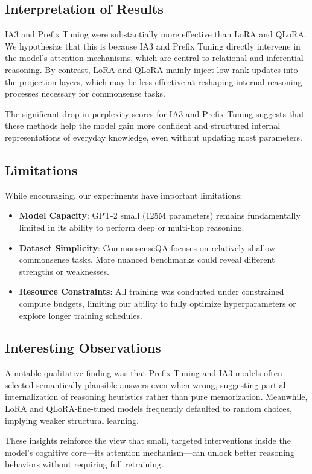 \documentclass[11pt,twocolumn]{article}
\begin{document}
\subsection{Interpretation of Results}
IA3 and Prefix Tuning were substantially more effective than LoRA and QLoRA. We hypothesize that this is because IA3 and Prefix Tuning directly intervene in the model’s attention mechanisms, which are central to relational and inferential reasoning. By contrast, LoRA and QLoRA mainly inject low-rank updates into the projection layers, which may be less effective at reshaping internal reasoning processes necessary for commonsense tasks.

The significant drop in perplexity scores for IA3 and Prefix Tuning suggests that these methods help the model gain more confident and structured internal representations of everyday knowledge, even without updating most parameters.

\subsection{Limitations}
While encouraging, our experiments have important limitations:
\begin{itemize}
    \item \textbf{Model Capacity}: GPT-2 small (125M parameters) remains fundamentally limited in its ability to perform deep or multi-hop reasoning.
    \item \textbf{Dataset Simplicity}: CommonsenseQA focuses on relatively shallow commonsense tasks. More nuanced benchmarks could reveal different strengths or weaknesses.
    \item \textbf{Resource Constraints}: All training was conducted under constrained compute budgets, limiting our ability to fully optimize hyperparameters or explore longer training schedules.
\end{itemize}

\subsection{Interesting Observations}
A notable qualitative finding was that Prefix Tuning and IA3 models often selected semantically plausible answers even when wrong, suggesting partial internalization of reasoning heuristics rather than pure memorization. Meanwhile, LoRA and QLoRA-fine-tuned models frequently defaulted to random choices, implying weaker structural learning.

These insights reinforce the view that small, targeted interventions inside the model's cognitive core—its attention mechanism—can unlock better reasoning behaviors without requiring full retraining.
\end{document}
